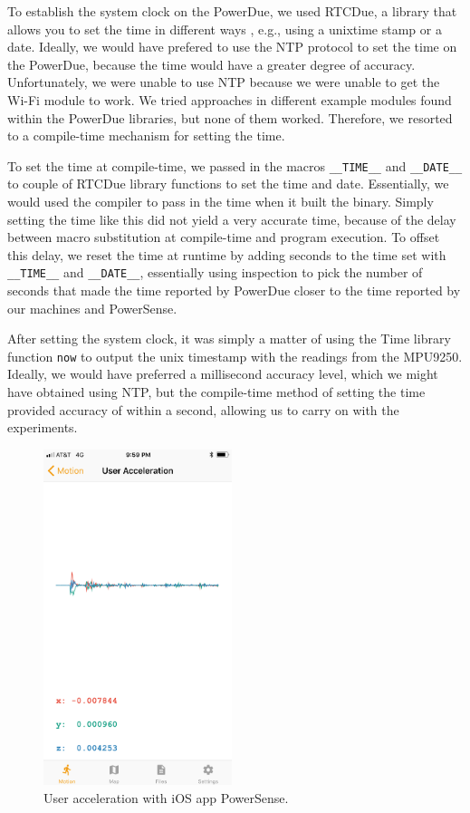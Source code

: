 \documentclass[journal]{IEEEtranTIE}
\begin{document}
To establish the system clock on the PowerDue, we used RTCDue, a library that
allows you to set the time in different ways \cite{RTCDue}, e.g., using a
unixtime stamp or a date. Ideally, we would have prefered to use the NTP
protocol to set the time on the PowerDue, because the time would have a greater
degree of accuracy. Unfortunately, we were unable to use NTP because we were
unable to get the Wi-Fi module to work. We tried approaches in different example
modules found within the PowerDue libraries, but none of them worked. Therefore,
we resorted to a compile-time mechanism for setting the time.

To set the time at compile-time, we passed in the macros \texttt{\_\_TIME\_\_}
and \texttt{\_\_DATE\_\_} to couple of RTCDue library functions to set the time
and date. Essentially, we would used the compiler to pass in the time when it
built the binary. Simply setting the time like this did not yield a very
accurate time, because of the delay between macro substitution at compile-time
and program execution. To offset this delay, we reset the time at runtime by
adding seconds to the time set with \texttt{\_\_TIME\_\_} and
\texttt{\_\_DATE\_\_}, essentially using inspection to pick the number of
seconds that made the time reported by PowerDue closer to the time reported by
our machines and PowerSense.

After setting the system clock, it was simply a matter of using the Time library
function \texttt{now} \cite{TimeLib} to output the unix timestamp with the
readings from the MPU9250. Ideally, we would have preferred a millisecond
accuracy level, which we might have obtained using NTP, but the compile-time
method of setting the time provided accuracy of within a second, allowing us to
carry on with the experiments.

\begin{figure}[!t]\centering
	\includegraphics[width=5.5cm]{acceleration}
	\caption{User acceleration with iOS app PowerSense.}\label{fig:fig2}
\end{figure}
\end{document}

